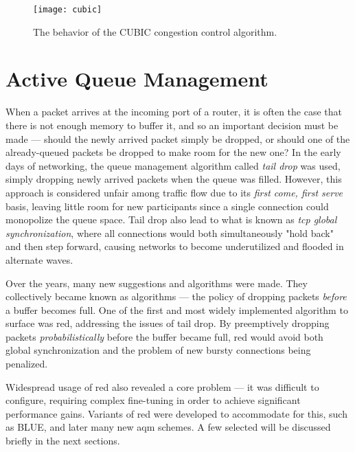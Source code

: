 \begin{figure}[H]
    \centering
    \texttt{[image: cubic]}
    \captionsetup{width=0.4\linewidth}
    \caption{The behavior of the CUBIC congestion control algorithm.}
    \label{fig:cubic}
\end{figure}




\section{Active Queue Management}

When a packet arrives at the incoming port of a router, it is often the case that there is not enough memory to buffer it, and so an important decision must be made --- should the newly arrived packet simply be dropped, or should one of the already-queued packets be dropped to make room for the new one? In the early days of networking, the queue management algorithm called \textit{tail drop} was used, simply dropping newly arrived packets when the queue was filled. However, this approach is considered unfair among traffic flow due to its \textit{first come, first serve} basis, leaving little room for new participants since a single connection could monopolize the queue space. \cite{on_traffic_phase_effects_in_packet_switched_gateways} Tail drop also lead to what is known as \textit{\gls{tcp} global synchronization}, where all connections would both simultaneously "hold back" and then step forward, causing networks to become underutilized and flooded in alternate waves.

Over the years, many new suggestions and algorithms were made. They collectively became known as  algorithms --- the policy of dropping packets \textit{before} a buffer becomes full. One of the first and most widely implemented algorithm to surface was \gls{red}, addressing the issues of tail drop. By preemptively dropping packets \textit{probabilistically} before the buffer became full, \gls{red} would avoid both global synchronization and the problem of new bursty connections being penalized. \cite{ieee251892}

Widespread usage of \gls{red} also revealed a core problem --- it was difficult to configure, requiring complex fine-tuning in order to achieve significant performance gains. Variants of \gls{red} were developed to accommodate for this, such as BLUE, and later many new \gls{aqm} schemes. A few selected will be discussed briefly in the next sections.



